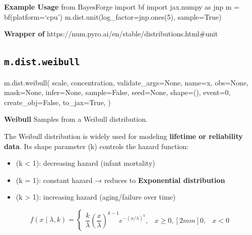 \documentclass[
  letterpaper,
  DIV=11,
  numbers=noendperiod]{scrartcl}
\newenvironment{Shaded}{\begin{snugshade}}{\end{snugshade}}
\newcommand{\DecValTok}[1]{\textcolor[rgb]{0.68,0.00,0.00}{#1}}
\newcommand{\NormalTok}[1]{\textcolor[rgb]{0.00,0.23,0.31}{#1}}
\newcommand{\OperatorTok}[1]{\textcolor[rgb]{0.37,0.37,0.37}{#1}}
\newcommand{\StringTok}[1]{\textcolor[rgb]{0.13,0.47,0.30}{#1}}
\newcommand{\VariableTok}[1]{\textcolor[rgb]{0.07,0.07,0.07}{#1}}
\providecommand{\tightlist}{%
  \setlength{\itemsep}{0pt}\setlength{\parskip}{0pt}}\usepackage{longtable,booktabs,array}
\begin{document}
\textbf{Example Usage} from BayesForge import bf import jax.numpy as jnp
m = bf(platform=`cpu') m.dist.unit(log\_factor=jnp.ones(5), sample=True)

\textbf{Wrapper of}
https://num.pyro.ai/en/stable/distributions.html\#unit

\subsection{\texorpdfstring{\texttt{m.dist.weibull}}{m.dist.weibull}}\label{weibull}

\begin{Shaded}
\begin{Highlighting}[]
\NormalTok{m.dist.weibull(}
\NormalTok{    scale,}
\NormalTok{    concentration,}
\NormalTok{    validate\_args}\OperatorTok{=}\VariableTok{None}\NormalTok{,}
\NormalTok{    name}\OperatorTok{=}\StringTok{\textquotesingle{}x\textquotesingle{}}\NormalTok{,}
\NormalTok{    obs}\OperatorTok{=}\VariableTok{None}\NormalTok{,}
\NormalTok{    mask}\OperatorTok{=}\VariableTok{None}\NormalTok{,}
\NormalTok{    infer}\OperatorTok{=}\VariableTok{None}\NormalTok{,}
\NormalTok{    sample}\OperatorTok{=}\VariableTok{False}\NormalTok{,}
\NormalTok{    seed}\OperatorTok{=}\VariableTok{None}\NormalTok{,}
\NormalTok{    shape}\OperatorTok{=}\NormalTok{(),}
\NormalTok{    event}\OperatorTok{=}\DecValTok{0}\NormalTok{,}
\NormalTok{    create\_obj}\OperatorTok{=}\VariableTok{False}\NormalTok{,}
\NormalTok{    to\_jax}\OperatorTok{=}\VariableTok{True}\NormalTok{,}
\NormalTok{)}
\end{Highlighting}
\end{Shaded}

\textbf{Weibull} Samples from a Weibull distribution.

The Weibull distribution is widely used for modeling \textbf{lifetime or
reliability data}. Its shape parameter (k) controls the hazard function:

\begin{itemize}
\tightlist
\item
  (k \textless{} 1): decreasing hazard (infant mortality)
\item
  (k = 1): constant hazard → reduces to \textbf{Exponential
  distribution}
\item
  (k \textgreater{} 1): increasing hazard (aging/failure over time)
\end{itemize}

\[
f(x \mid \lambda, k) =
\begin{cases}
\dfrac{k}{\lambda} \left(\dfrac{x}{\lambda}\right)^{k-1} e^{-(x/\lambda)^k}, & x \ge 0, [2mm]
0, & x < 0
\end{cases}
\]
\end{document}
